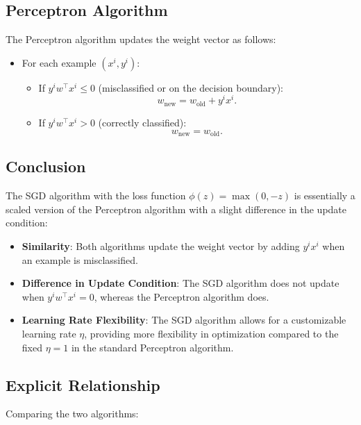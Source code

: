 \documentclass{article}
\begin{document}
\subsection*{Perceptron Algorithm}

The Perceptron algorithm updates the weight vector as follows:
\begin{itemize}
\item For each example $(x^i, y^i)$:
\begin{itemize}
\item If $y^i w^\top x^i \leq 0$ (misclassified or on the decision boundary):
\[
w_{\text{new}} = w_{\text{old}} + y^i x^i.
\]
\item If $y^i w^\top x^i > 0$ (correctly classified):
\[
w_{\text{new}} = w_{\text{old}}.
\]
\end{itemize}
\end{itemize}

\subsection*{Conclusion}

The SGD algorithm with the loss function $\phi(z) = \max(0, -z)$ is essentially a scaled version of the Perceptron algorithm with a slight difference in the update condition:

\begin{itemize}
\item \textbf{Similarity}: Both algorithms update the weight vector by adding $y^i x^i$ when an example is misclassified.
\item \textbf{Difference in Update Condition}: The SGD algorithm does not update when $y^i w^\top x^i = 0$, whereas the Perceptron algorithm does.
\item \textbf{Learning Rate Flexibility}: The SGD algorithm allows for a customizable learning rate $\eta$, providing more flexibility in optimization compared to the fixed $\eta = 1$ in the standard Perceptron algorithm.
\end{itemize}

\subsection*{Explicit Relationship}

Comparing the two algorithms:
\end{document}
